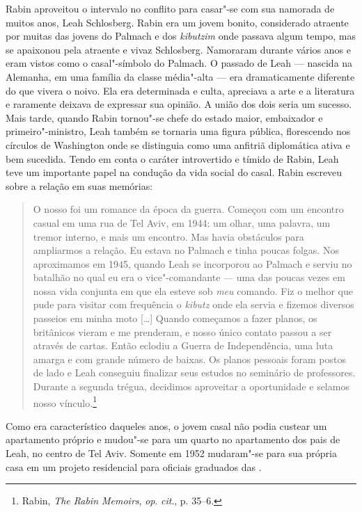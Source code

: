 Rabin aproveitou o intervalo no conflito para casar"-se com sua namorada
de muitos anos, Leah Schlosberg. Rabin era um jovem bonito, considerado
atraente por muitas das jovens do Palmach e dos \emph{kibutzim} onde passava
algum tempo, mas se apaixonou pela atraente e vivaz Schlosberg.
Namoraram durante vários anos e eram vistos como o casal"-símbolo do
Palmach. O passado de Leah --- nascida na Alemanha, em uma família da
classe média"-alta --- era dramaticamente diferente do que vivera o noivo.
Ela era determinada e culta, apreciava a arte e a literatura e raramente
deixava de expressar sua opinião. A união dos dois seria um sucesso. Mais
tarde, quando Rabin tornou"-se chefe do estado maior, embaixador e
primeiro"-ministro, Leah também se tornaria uma figura pública,
florescendo nos círculos de Washington onde se distinguia como uma
anfitriã diplomática ativa e bem sucedida. Tendo em conta o caráter
introvertido e tímido de Rabin, Leah teve um importante papel na
condução da vida social do casal. Rabin escreveu sobre a relação em suas
memórias:

\begin{quote}
O nosso foi um romance da época da guerra. Começou com um encontro
casual em uma rua de Tel Aviv, em 1944: um olhar, uma palavra, um tremor
interno, e mais um encontro. Mas havia obstáculos para ampliarmos a
relação. Eu estava no Palmach e tinha poucas folgas. Nos aproximamos em
1945, quando Leah se incorporou ao Palmach e serviu no batalhão no qual
eu era o vice"-comandante --- uma das poucas vezes em nossa vida conjunta
em que ela esteve sob \emph{meu} comando. Fiz o melhor que pude para
visitar com frequência o \emph{kibutz} onde ela servia e fizemos diversos
passeios em minha moto {[}\ldots{}{]} Quando começamos a fazer planos, os britânicos
vieram e me prenderam, e nosso único contato passou a ser através de
cartas. Então eclodiu a Guerra de Independência, uma luta amarga e com
grande número de baixas. Os planos pessoais foram postos de lado e Leah
conseguiu finalizar seus estudos no seminário de professores. Durante a
segunda trégua, decidimos aproveitar a oportunidade e selamos nosso
vínculo.\footnote{Rabin, \emph{The Rabin Memoirs}, \emph{op}. \emph{cit}., p. 35--6.}
\end{quote}

Como era característico daqueles anos, o jovem casal não podia custear
um apartamento próprio e mudou"-se para um quarto no apartamento
dos pais de Leah, no centro de Tel Aviv. Somente em 1952 mudaram"-se para
sua própria casa em um projeto residencial para oficiais graduados das
.

